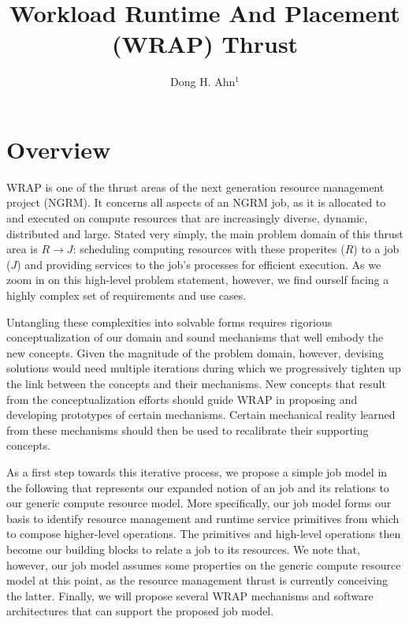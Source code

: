 \documentclass[10pt]{article}
\newcommand{\ngrm}[0]{NGRM}
\newcommand{\ngrmjob}[0]{NGRM job}
\begin{document}
\title{Workload Runtime And Placement (WRAP) Thrust}

\author{Dong H. Ahn$^1$}


%
\date{}
\maketitle

\section{Overview}
WRAP is one of the thrust areas of the next generation resource
management project (\ngrm). It concerns all aspects 
of an \ngrmjob, as it is allocated to and executed on compute resources 
that are increasingly diverse, dynamic, distributed and large. 
Stated very simply, the main problem domain of this thrust
area is $R \rightarrow J$: scheduling computing resources 
with these properites ($R$) to a job ($J$) and providing services
to the job's processes for efficient execution. As we zoom in on 
this high-level problem statement, however,
we find ourself facing a highly complex set of requirements
and use cases. 

Untangling these complexities into solvable forms requires 
rigorious conceptualization of our domain and 
sound mechanisms that well embody the new concepts.
Given the magnitude of the problem domain, however, devising 
solutions would need multiple iterations during
which we progressively tighten up the link between
the concepts and their mechanisms. New concepts that result from 
the conceptualization efforts
should guide WRAP in proposing and developing 
prototypes of certain mechanisms. Certain 
mechanical reality learned from these mechanisms should then be 
used to recalibrate their supporting concepts. 

As a first step towards this iterative process,
we propose a simple job model in the following that represents 
our expanded notion of an job and its relations 
to our generic compute resource model. 
More specifically, our job model forms our basis to identify 
resource management and runtime service primitives 
from which to compose higher-level operations.
The primitives and high-level operations then 
become our building blocks to relate a job 
to its resources. We note that, however, our job model 
assumes some properties on the generic
compute resource model at this point, as the resource management thrust is
currently conceiving the latter.
Finally, we will propose several WRAP mechanisms
and software architectures that can support the proposed job model.
\end{document}
